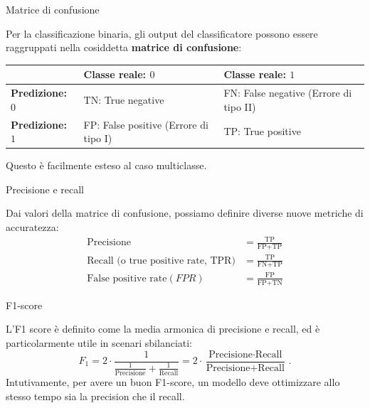 \documentclass[12pt,aspectratio=169]{beamer}
\begin{document}
\begin{frame}{Matrice di confusione}
	
	Per la classificazione binaria, gli output del classificatore possono essere raggruppati nella cosiddetta \textbf{matrice di confusione}:
	
	\def\arraystretch{1.5}
	\begin{tabular}{m{}|m{}|m{}}
		& \textbf{Classe reale: $0$} & \textbf{Classe reale: $1$} \\ \hline
		\textbf{Predizione: $0$} & \cellcolor{green!20!white}TN: True negative & \cellcolor{red!20!white}FN: False negative \newline(Errore di tipo II) \\ \hline
		\textbf{Predizione: $1$} & \cellcolor{red!20!white}FP: False positive \newline(Errore di tipo I) & \cellcolor{green!20!white}TP: True positive
	\end{tabular}
	\def\arraystretch{1.0}
	
	Questo è facilmente esteso al caso multiclasse.
	
\end{frame}

\begin{frame}{Precisione e recall}
	
	Dai valori della matrice di confusione, possiamo definire diverse nuove metriche di accuratezza:
	\begin{align}
		\text{Precisione} & = \frac{\text{TP}}{\text{FP} + \text{TP}} \\
		\text{Recall (o true positive rate, TPR)} & = \frac{\text{TP}}{\text{FN} + \text{TP}} \\
		\text{False positive rate} (FPR) & = \frac{\text{FP}}{\text{FP} + \text{TN}} 
	\end{align}

\end{frame}

\begin{frame}{F1-score}
	
	L'F1 score è definito come la media armonica di precisione e recall, ed è particolarmente utile in scenari sbilanciati:
	\begin{equation}
		F_1 = 2 \cdot \frac{1}{\frac{1}{\text{Precisione}} + \frac{1}{\text{Recall}}} = 2 \cdot \frac{\text{Precisione} \cdot \text{Recall}}{\text{Precisione} + \text{Recall}} \,.
	\end{equation}
	Intutivamente, per avere un buon F1-score, un modello deve ottimizzare allo stesso tempo sia la precision che il recall.
	
\end{frame}
\end{document}
